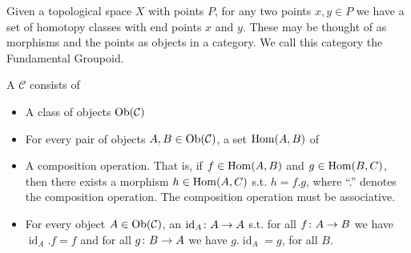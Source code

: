 \documentclass[11pt,leqno,oneside]{amsart}
\newenvironment{dateenv}{
  \vspace{1em}
}{
  \vspace{1em}
}
\newcommand{\mydate}[4]{
  \newdate{#1}{#2}{#3}{#4}
  \begin{dateenv}
    \hfill\displaydate{#1}
  \end{dateenv}
}
\numberwithin{thm}{section}
\newcommand{\id}{\operatorname{id}}
\begin{document}
Given a topological space \(X\) with points \(P\), for any two points
\(x,y \in P\) we have a set of homotopy classes with end points \(x\)
and \(y\). These may be thought of as morphisms and the points as
objects in a category. We call this category the Fundamental Groupoid.

\mydate{d2}{20}{1}{2017}

\begin{defn}
  A  $\mathcal{C}$ consists of
  \begin{itemize}
    \item A class of objects $\operatorname{Ob}(\mathcal{C})$
    \item For every pair of objects $A, B \in \operatorname{Ob}(\mathcal{C})$, a set $\operatorname{Hom}(A, B)$ of 
    \item A composition operation.  That is, if $f \in \operatorname{Hom}(A,B)$ and $g \in \operatorname{Hom}(B,C)$, then there exists a morphism $h \in \operatorname{Hom}(A,C)$ s.t. $h = f.g$, where ``.'' denotes the composition operation.  The composition operation must be associative.
    \item For every object $A \in \operatorname{Ob}(\mathcal{C})$, an  $\id_A\from A \to A$ s.t. for all $f\colon A \to B$ we have $\id_A.f = f$ and for all $g\colon B \to A$ we have $g.\id_A = g$, for all $B$.
  \end{itemize}
\end{defn}
\end{document}
